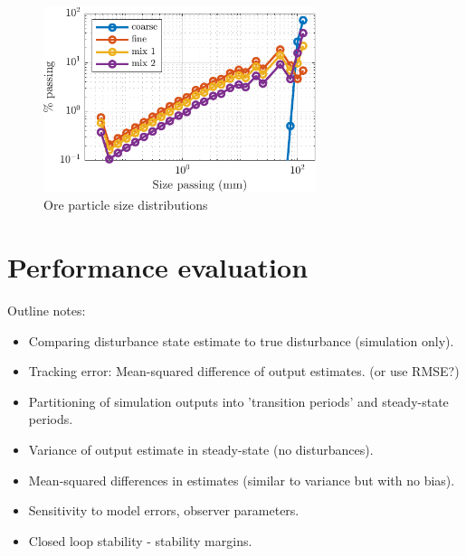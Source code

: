 \begin{figure}[htp]
	\centering
	\includegraphics[width=8cm]{images/coarse_fine_psd_plot.pdf}
	\caption{Ore particle size distributions}
	\label{fig:coarse_fine_psd_plot}
\end{figure}

\section{Performance evaluation}

Outline notes:
\begin{itemize}
	\item Comparing disturbance state estimate to true disturbance (simulation only).
	\item Tracking error: Mean-squared difference of output estimates. (or use RMSE?)
	\item Partitioning of simulation outputs into 'transition periods' and steady-state periods.
	\item Variance of output estimate in steady-state (no disturbances).
	\item Mean-squared differences in estimates (similar to variance but with no bias).
	\item Sensitivity to model errors, observer parameters.
	\item Closed loop stability - stability margins.
\end{itemize}

